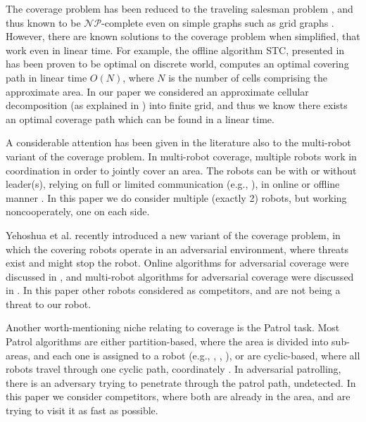 \documentclass[a4paper,english,10pt]{article}
\begin{document}
The coverage problem has been reduced to the traveling salesman problem \cite{arkin2000approximation}, and thus known to be $\mathcal{NP}$-complete even on simple graphs such as grid graphs \cite{papadimitriou1977euclidean}. However, there are known solutions to the coverage problem when simplified, that work even in linear time. For example, the offline algorithm STC, presented in \cite{gabriely2001spanning} has been proven to be optimal on discrete world, computes an optimal covering path in linear time $O(N)$, where $N$ is the number of cells comprising the approximate area. In our paper we considered an approximate cellular decomposition (as explained in \cite{galceran2013survey}) into finite grid, and thus we know there exists an optimal coverage path which can be found in a linear time.

A considerable attention has been given in the literature also to the multi-robot variant of the coverage problem. In multi-robot coverage, multiple robots work in coordination in order to jointly cover an area. The robots can be with or without leader(s), relying on full or limited communication (e.g., \cite{agmon2008giving}), in online or offline manner \cite{agmon2008giving, de2005blind}.
In this paper we do consider multiple (exactly 2) robots, but working noncooperately, one on each side.

Yehoshua et al. \cite{yehoshua2013robotic} recently introduced a new variant of the coverage problem, in which the covering robots operate in an adversarial environment, where threats exist and might stop the robot. Online algorithms for adversarial coverage were discussed in  \cite{yehoshua2015online}, and multi-robot algorithms for adversarial coverage were discussed in \cite{yehoshua2016multi}.
In this paper other robots considered as competitors, and are not being a threat to our robot. %

Another worth-mentioning niche relating to coverage is the Patrol task. %
Most Patrol algorithms are either partition-based, where the area is divided into sub-areas, and each one is assigned to a robot (e.g., \cite{guo2004towards}, \cite{guo2004coverage}, \cite{jung2002tracking}), or are cyclic-based, where all robots travel through one cyclic path, coordinately \cite{chevaleyre2004theoretical}. 
In adversarial patrolling, there is an adversary trying to penetrate through the patrol path, undetected. In this paper we consider competitors, where both are already in the area, and are trying to visit it as fast as possible. %
\end{document}
